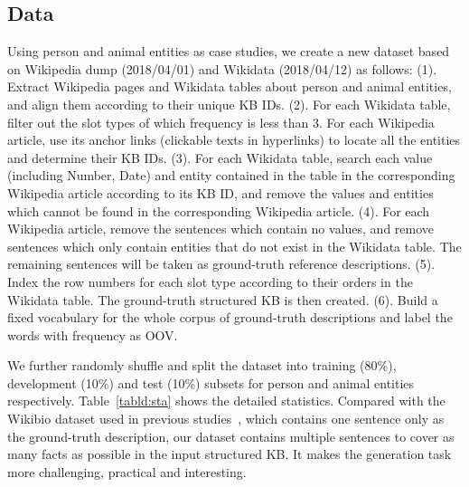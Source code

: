 \documentclass[11pt,a4paper]{article}
\begin{document}
\subsection{Data}



Using person and animal entities as case studies, we create a new dataset based on Wikipedia dump (2018/04/01) and Wikidata (2018/04/12) as follows: (1). Extract Wikipedia pages and Wikidata tables about person and animal entities, and align them according to their unique KB IDs. (2). For each Wikidata table, filter out the slot types of which frequency is less than 3. For each Wikipedia article, use its anchor links (clickable texts in hyperlinks)  to locate all the entities and determine their KB IDs. (3). For each Wikidata table, search each value (including Number, Date) and entity contained in the table in the corresponding Wikipedia article according to its KB ID, and remove the values and entities which cannot be found in the corresponding Wikipedia article.
(4). For each Wikipedia article, remove the sentences which contain no values, and remove sentences which only contain entities that do not exist in the Wikidata table. 
The remaining sentences will be taken as ground-truth reference descriptions. (5). Index the row numbers for each slot type according to their orders in the Wikidata table. The ground-truth structured KB is then created. (6). Build a fixed vocabulary for the whole corpus of ground-truth descriptions and label the words with frequency  as OOV.















We further randomly shuffle and split the dataset into training (80\%), development (10\%) and test (10\%) subsets for person and animal entities respectively. Table~\ref{tabld:sta} shows the detailed statistics. Compared with the Wikibio dataset used in previous studies~\cite{biogen16,sha2017order,table2text17}, which contains one sentence only as the ground-truth description, our dataset contains multiple sentences to cover as many facts as possible in the input structured  KB. It makes the generation task more challenging, practical and interesting. 
\end{document}
